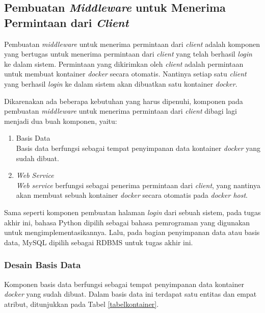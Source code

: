 	\subsection{Pembuatan \textit{Middleware} untuk Menerima Permintaan dari \textit{Client}}
	Pembuatan \textit{middleware} untuk menerima permintaan dari \textit{client} adalah komponen yang bertugas untuk menerima permintaan dari \textit{client} yang telah berhasil \textit{login} ke dalam sistem. Permintaan yang dikirimkan oleh \textit{client} adalah permintaan untuk membuat kontainer \textit{docker} secara otomatis. Nantinya setiap satu \textit{client} yang berhasil \textit{login} ke dalam sistem akan dibuatkan satu kontainer \textit{docker}.
	
	Dikarenakan ada beberapa kebutuhan yang harus dipenuhi, komponen pada pembuatan \textit{middleware} untuk menerima permintaan dari \textit{client} dibagi lagi menjadi dua buah komponen, yaitu:
	
   	\begin{enumerate}
   		\item Basis Data \\
   		Basis data  berfungsi sebagai tempat penyimpanan data kontainer \textit{docker} yang sudah dibuat.
   		\item \textit{Web Service} \\
   		\textit{Web service} berfungsi sebagai penerima permintaan dari \textit{client}, yang nantinya akan membuat sebuah kontainer \textit{docker} secara otomatis pada \textit{docker host}.
   	\end{enumerate}
	
	Sama seperti komponen pembuatan halaman \textit{login} dari sebuah sistem, pada tugas akhir ini, bahasa Python dipilih sebagai bahasa pemrograman yang digunakan untuk mengimplementasikannya. Lalu, pada bagian penyimpanan data atau basis data, MySQL dipilih sebagai RDBMS untuk tugas akhir ini. 
	
	\subsubsection{Desain Basis Data}
	Komponen basis data berfungsi sebagai tempat penyimpanan data kontainer \textit{docker} yang sudah dibuat. Dalam basis data ini terdapat satu entitas dan empat atribut, ditunjukkan pada Tabel \ref{tabelkontainer}.
	
